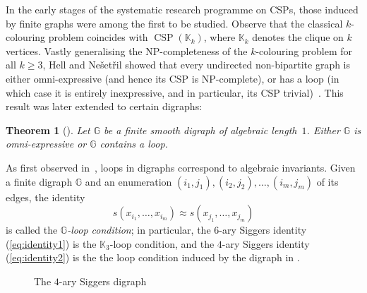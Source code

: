 \documentclass[a4paper,reqno, cleveref]{amsart}
\newtheorem{theorem}{Theorem}[section]
\newcommand{\ignore}[1]{}
\DeclareMathOperator{\CSP}{CSP}
\newcommand{\sG}{\mathbb G}
\begin{document}
In the early stages of the 
systematic research programme on CSPs, those induced by finite graphs were among the first to be studied. Observe that the classical $k$-colouring problem coincides with $\CSP(\mathbb K_k)$, where $\mathbb K_k$ denotes the clique on $k$ vertices. Vastly generalising the NP-completeness of the $k$-colouring problem for all $k \geq 3$, Hell and Ne\v{s}et\v{r}il showed that every undirected non-bipartite graph is either omni-expressive (and hence its CSP is NP-complete), or has a loop (in which case it is entirely inexpressive, and in particular, its CSP  trivial)~\cite{HellNesetril}.
This result was later extended to certain digraphs:


\begin{theorem}[\cite{BartoKozikNiven}]\label{bartokozikniven}
  Let $\sG$ be a finite smooth digraph of algebraic length~$1$. Either $\sG$ is omni-expressive or  $\sG$ contains a loop.
\end{theorem}
 
 
  As first observed in~\cite{Siggers}, loops in digraphs correspond to  algebraic invariants. 
Given a finite digraph $\sG$ and an enumeration $(i_1,j_1),(i_2,j_2),\dots,(i_m,j_m)$ of its edges,   the identity 
\[s(x_{i_1} , \dots , x_{i_m} ) \approx s(x_{j_1} , \dots , x_{j_m})\]
is called the \emph{$\sG$-loop condition};  in particular, the $6$-ary Siggers identity (\ref{eq:identity1}) is the $\mathbb K_3$-loop condition, and the $4$-ary Siggers identity (\ref{eq:identity2}) is the the loop condition induced by the digraph in .
\ignore{\begin{center}
  \begin{tikzcd}
  & e \arrow[rd] & \\
a \arrow[ru] \arrow[rr, no head] & & r
\end{tikzcd}
\end{center} }
\begin{figure}[t]
    \centering
    \caption{The $4$-ary Siggers digraph}
    \label{fig:siggers}
    \vspace{\baselineskip}


\end{figure}
\end{document}
